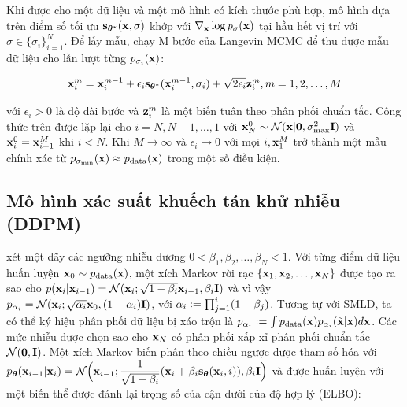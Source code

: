 \documentclass{article} %
\begin{document}
Khi được cho một dữ liệu và một mô hình có kích thước phù hợp, mô hình dựa trên điểm số tối ưu $\bold{s}_{\boldsymbol{\theta}^{\ast}}(\bold{x}, \sigma)$ khớp với $\nabla_{\bold{x}} \log p_{\sigma}(\bold{x})$ tại hầu hết vị trí với $\sigma \in \lbrace \sigma_i \rbrace_{i=1}^N$.
Để lấy mẫu, \citep{song2019generative} chạy M bước của Langevin MCMC để thu được mẫu dữ liệu cho lần lượt từng $p_{\sigma_i}(\bold{x})$:

\begin{equation}
    \bold{x}_i^m = \bold{x}_i^{m-1} + \epsilon_i \bold{s}_{\boldsymbol{\theta}^{\ast}} (\bold{x}_i^{m-1}, \sigma_i) + \sqrt{2 \epsilon_i} \bold{z}_i^m, m = 1, 2, \dots, M
\end{equation}

với $\epsilon_i > 0$ là độ dài bước và $\bold{z}_i^m$ là một biến tuân theo phân phối chuẩn tắc.
Công thức trên được lặp lại cho $i=N, N-1, \dots, 1$ với $\bold{x}_N^0 \sim \mathcal{N}(\bold{x} \vert \bold{0}, \sigma_{\max}^2 \bold{I})$ và $\bold{x}_i^0 = \bold{x}_{i+1}^M$ khi $i < N$. Khi $M \rightarrow \infty$ và $\epsilon_i \rightarrow 0$ với mọi $i, \bold{x}_1^M$ trở thành một mẫu chính xác từ $p_{\sigma_{\min}}(\bold{x})\approx p_{\mathrm{data}}(\bold{x})$ trong một số điều kiện.


\subsection{Mô hình xác suất khuếch tán khử nhiễu (DDPM)} \label{2.2}

\citep{sohl2015deep,ho2020denoising} xét một dãy các ngưỡng nhiễu dương $0 < \beta_1, \beta_2, \dots, \beta_N < 1$.
Với từng điểm dữ liệu huấn luyện $\bold{x}_0 \sim p_{\mathrm{data}}(\bold{x})$, một xích Markov rời rạc $\lbrace \bold{x}_1, \bold{x}_2, \dots, \bold{x}_N \rbrace$ được tạo ra sao cho $p(\bold{x}_i \vert \bold{x}_{i-1}) = \mathcal{N}(\bold{x}_i; \sqrt{1-\beta_i} \bold{x}_{i-1}, \beta_i \bold{I})$ và vì vậy $p_{\alpha_i}=\mathcal{N}(\bold{x}_i; \sqrt{\alpha_i}\bold{x}_0, (1-\alpha_i)\bold{I})$,
với $\alpha_i \vcentcolon = \prod_{j=1}^i (1 - \beta_j)$.
Tương tự với SMLD, ta có thể ký hiệu phân phối dữ liệu bị xáo trộn là $p_{\alpha_i}\vcentcolon =  \int p_{\mathrm{data}}(\bold{x}) p_{\alpha_i}(\tilde{\bold{x}} \vert \bold{x}) d \bold{x}$.
Các mức nhiễu được chọn sao cho $\bold{x}_N$ có phân phối xấp xỉ phân phối chuẩn tắc $\mathcal{N}(\bold{0}, \bold{I})$.
Một xích Markov biến phân theo chiều ngược được tham số hóa với $p_{\boldsymbol{\theta}} (\bold{x}_{i-1} \vert \bold{x}_i)=\mathcal{N}\Big(\bold{x}_{i-1}; \dfrac{1}{\sqrt{1-\beta_i}}(\bold{x}_i + \beta_i \bold{s}_{\boldsymbol{\theta}}(\bold{x}_i, i)), \beta_i \bold{I}\Big)$ và được huấn luyện với một biến thể được đánh lại trọng số của cận dưới của độ hợp lý (ELBO):
\end{document}

